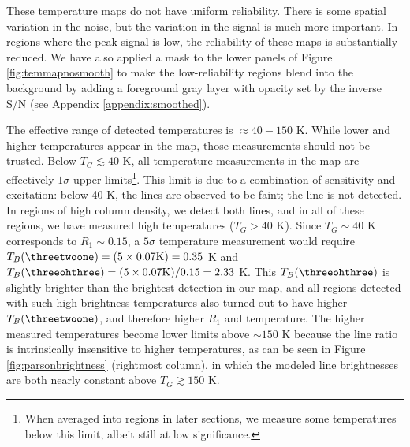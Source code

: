 

These temperature maps do not have uniform reliability.  There is some spatial
variation in the noise, but the variation in the signal is much more important.
In regions where the peak signal is low, the reliability of these maps is
substantially reduced.  We have also applied a mask to the lower panels of
Figure \ref{fig:temmapnosmooth} to make the low-reliability regions blend into
the background by adding a foreground gray layer with opacity set by the
inverse S/N (see Appendix \ref{appendix:smoothed}).

The effective range of detected temperatures is $\approx40-150$ K. While lower
and higher temperatures appear in the map, those measurements should not be
trusted.  Below $T_G\lesssim40$ K, all temperature measurements in the map are
effectively $1\sigma$ upper limits\footnote{When averaged into regions in later
sections, we measure some temperatures below this limit, albeit still at low
significance.}.  This
limit is due to a combination of sensitivity and excitation: below 40 K, the
\para lines are observed to be faint; the \threetwoone line is not detected.
In regions of high column density, we detect both lines, and in all of these
regions, we have measured high temperatures ($T_G>40$ K).  
Since $T_G\sim40$ K corresponds to $R_1\sim0.15$, a $5\sigma$ temperature
measurement would require $T_B(\threetwoone)=(5\times0.07\mathrm{K}) = 0.35$ K
and
$T_B(\threeohthree) = (5 \times 0.07 \mathrm{K}) /
0.15 = 2.33$ K.  This $T_B(\threeohthree)$ is slightly brighter than the
brightest detection in our map,
and all regions detected with such high brightness
temperatures also turned out to have higher $T_B(\threetwoone)$, and therefore
higher $R_1$ and temperature.
The higher measured temperatures
become lower limits above $\sim150$ K because the \para line ratio is
intrinsically insensitive to higher temperatures, as can be seen in Figure
\ref{fig:parsonbrightness} (rightmost column), in which the modeled line
brightnesses are both nearly constant above $T_G\gtrsim150$ K.


